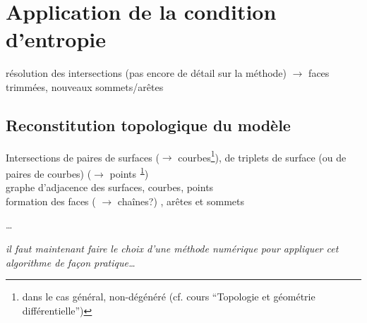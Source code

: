 \section{Application de la condition d'entropie}
résolution des intersections (pas encore de détail sur la méthode) $\to$ faces trimmées, nouveaux sommets/arêtes

\subsection{Reconstitution topologique du modèle \brep}
Intersections de paires de surfaces ($\to$ courbes\footnote{dans le cas général, non-dégénéré (cf. cours ``Topologie et géométrie différentielle'')\label{foot}}), de triplets de surface (ou de paires de courbes) ($\to$ points\textsuperscript{~\ref{foot}})\\
graphe d'adjacence des surfaces, courbes, points \cite[Chap. 4]{pentcheva2010}\\
formation des faces ( $\to$ chaînes?) \cite[Chap. 7]{pentcheva2010}, arêtes et sommets \cite[Chap. 5]{pentcheva2010}

\ldots



\bigskip
\textit{il faut maintenant faire le choix d'une méthode numérique pour appliquer cet algorithme de façon pratique\ldots}